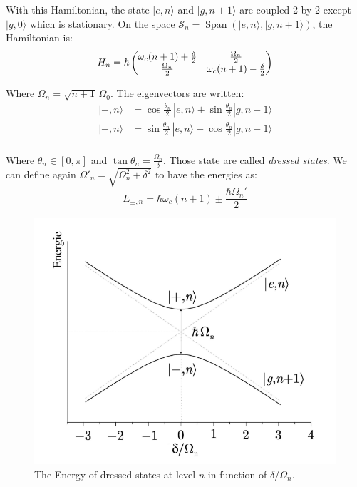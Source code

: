 \documentclass[10pt,a4paper]{report}
\theoremstyle{plain}
\theoremstyle{definition}
\theoremstyle{remark}
\newcommand{\ket}[1]{|#1\rangle}
\newcommand{\mat}[1]{\begin{pmatrix}#1\end{pmatrix}}
\DeclareMathOperator{\Span}{Span}
\newcommand{\twoline}{\vphantom{\frac\int\int}}
\begin{document}
With this Hamiltonian, the state $\ket{e,n}$ and $\ket{g,n+1}$ are coupled 2 by
2 except $\ket{g,0}$ which is stationary. On the space $\mathcal{S}_n =
\Span(\ket{e,n},\ket{g,n+1})$, the Hamiltonian is:
\[\twoline H_n = \hbar \mat{\omega_c(n+1) + \frac{\delta}2& \frac{\Omega_n}2\\
    \frac{\Omega_n}2&\omega_c(n+1) - \frac{\delta}2}\]

Where $\Omega_n = \sqrt{n+1} \,\Omega_0$. The eigenvectors are written:
\newcommand{\tnt}{\frac{\theta_n}2}
\begin{align*}
  \ket{+,n} &= \cos \tnt \,\ket{e,n} + \sin \tnt \ket{g,n+1}\\
  \ket{-,n} &= \sin \tnt \,\ket{e,n} - \cos \tnt \ket{g,n+1}\\
\end{align*}

\vspace{-0.5cm}

Where $\theta_n \in [0,\pi]$ and $\tan \theta_n = \frac {\Omega_n}{\delta}$.
Those state are called \emph{dressed states}.
We can define again $\Omega'_n = \sqrt{\Omega_n^2 + \delta^2}$ to have the energies as:
\[E_{\pm,n} = \hbar \omega_c(n+1) \pm \frac{\hbar \Omega_n'}2\]

\begin{figure}
  \centering
  \includegraphics[scale=0.3]{dressed.png}
  \caption{The Energy of dressed states at level $n$ in function of $\delta/\Omega_n$.}
  \label{fig:dressedenergy}
\end{figure}
\end{document}
